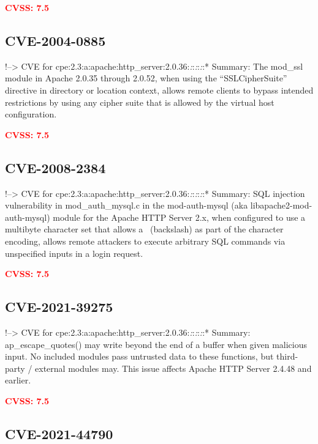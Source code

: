 \documentclass[a4paper, 12pt]{article}
\begin{document}
\textbf{\textcolor{red}{CVSS: 7.5}}

\hypertarget{cve-2004-0885}{%
\subsection{CVE-2004-0885}\label{cve-2004-0885}}

!--\textgreater{} CVE for
cpe:2.3:a:apache:http\_server:2.0.36:\emph{:}:\emph{:}:\emph{:}:*
Summary: The mod\_ssl module in Apache 2.0.35 through 2.0.52, when using
the ``SSLCipherSuite'' directive in directory or location context,
allows remote clients to bypass intended restrictions by using any
cipher suite that is allowed by the virtual host configuration.

\textbf{\textcolor{red}{CVSS: 7.5}}

\hypertarget{cve-2008-2384}{%
\subsection{CVE-2008-2384}\label{cve-2008-2384}}

!--\textgreater{} CVE for
cpe:2.3:a:apache:http\_server:2.0.36:\emph{:}:\emph{:}:\emph{:}:*
Summary: SQL injection vulnerability in mod\_auth\_mysql.c in the
mod-auth-mysql (aka libapache2-mod-auth-mysql) module for the Apache
HTTP Server 2.x, when configured to use a multibyte character set that
allows a ~(backslash) as part of the character encoding, allows remote
attackers to execute arbitrary SQL commands via unspecified inputs in a
login request.

\textbf{\textcolor{red}{CVSS: 7.5}}

\hypertarget{cve-2021-39275}{%
\subsection{CVE-2021-39275}\label{cve-2021-39275}}

!--\textgreater{} CVE for
cpe:2.3:a:apache:http\_server:2.0.36:\emph{:}:\emph{:}:\emph{:}:*
Summary: ap\_escape\_quotes() may write beyond the end of a buffer when
given malicious input. No included modules pass untrusted data to these
functions, but third-party / external modules may. This issue affects
Apache HTTP Server 2.4.48 and earlier.

\textbf{\textcolor{red}{CVSS: 7.5}}

\hypertarget{cve-2021-44790}{%
\subsection{CVE-2021-44790}\label{cve-2021-44790}}
\end{document}

